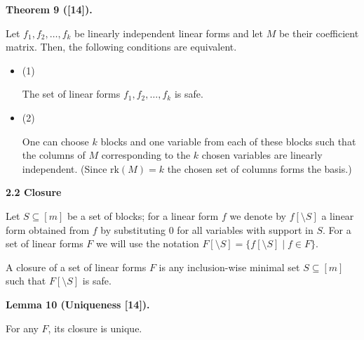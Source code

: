 \par\medskip\noindent\textbf{
Theorem 9 ([14]).
}\par



Let $f_{1},f_{2},\dots,f_{k}$ be linearly independent linear forms and let $M$ be their coefficient matrix. Then, the following conditions are equivalent.\par


\begin{itemize}


\item 
(1) 


The set of linear forms $f_{1},f_{2},\dots,f_{k}$ is safe.\par





\item 
(2) 


One can choose $k$ blocks and one variable from each of these blocks such that the columns of $M$ corresponding to the $k$ chosen variables are linearly independent. (Since $\mathrm{rk}(M)=k$ the chosen set of columns forms the basis.)\par





\end{itemize}



\par\medskip\noindent\textbf{
2.2 Closure}\par


Let $S\subseteq[m]$ be a set of blocks;
for a linear form $f$ we denote by $f[\setminus S]$ a linear form obtained from $f$ by substituting $0$ for all variables with support in $S$. For a set of linear forms $F$ we will use the notation $F[\setminus S]=\{f[\setminus S]\mid f\in F\}$.\par



A closure of a set of linear forms $F$ is any inclusion-wise minimal set $S\subseteq[m]$ such that $F[\setminus S]$ is safe.\par



\par\medskip\noindent\textbf{
Lemma 10 (Uniqueness [14]).
}\par



For any $F$, its closure is unique.\par




